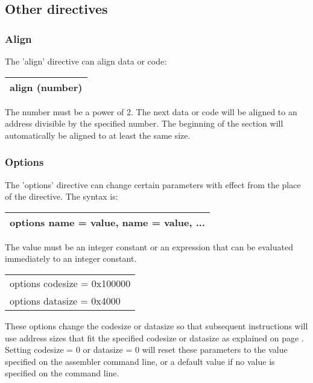 \documentclass[forwardcom.tex]{subfiles}
\begin{document}
\vv


\subsection{Other directives} \label{assemblyOtherDirectives}

\subsubsection{Align}
The 'align' directive can align data or code:
\vv

\begin{tabular}{|p{150mm}|}
\hline
\hspace{4mm} align (number)\\
\hline
\end{tabular}
\vv

The number must be a power of 2. The next data or code will be aligned to an address divisible by the specified number. The beginning of the section will automatically be aligned to at least the same size.
\vv


\subsubsection{Options} \label{optionsDirective}
The 'options' directive can change certain parameters with effect from the place of the directive. The syntax is:
\vv

\begin{tabular}{|p{150mm}|}
\hline
\hspace{4mm} options name = value, name = value, ...\\
\hline
\end{tabular}
\vv

The value must be an integer constant or an expression that can be evaluated immediately to an integer constant.
\vv

\begin{tabular}{|p{150mm}|}
\hline
\hspace{4mm} options codesize = 0x100000 \\
\hspace{4mm} options datasize = 0x4000 \\
\hline
\end{tabular}
\vv

These options change the codesize or datasize so that subsequent instructions
will use address sizes that fit the specified codesize or datasize as explained on page \pageref{SpecifyDataSize}. Setting codesize = 0 or datasize = 0 will reset these parameters to the value specified on the assembler command line, or a default value if no value is specified on the command line.
\vv
\end{document}
